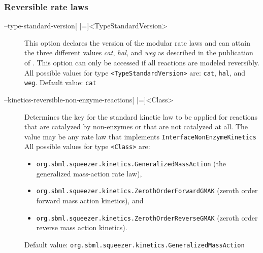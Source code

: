 \subsubsection{Reversible rate laws}
\begin{description}
\item[--type-standard-version{[} |={]}<TypeStandardVersion>]
  This option declares the version of the modular rate laws and
  can attain the three different values \emph{cat}, \emph{hal}, and \emph{weg}
  as described in the publication of \citet{Liebermeister2010}. This option
  can only be accessed if all reactions are modeled reversibly.
  All possible values for type \texttt{<TypeStandardVersion>} are:
  \texttt{cat}, \texttt{hal}, and \texttt{weg}.
  Default value: \texttt{cat}

\item[--kinetics-reversible-non-enzyme-reactions{[} |={]}<Class>]
  Determines the key for the standard kinetic law to be applied
  for reactions that are catalyzed by non-enzymes or that are
  not catalyzed at all. The value may be any rate law that implements
  \texttt{InterfaceNonEnzymeKinetics}
  All possible values for type \texttt{<Class>} are:
  \begin{itemize}
  \item\texttt{org.sbml.squeezer.kinetics.GeneralizedMassAction} (the generalized mass-action rate law),
  \item\texttt{org.sbml.squeezer.kinetics.ZerothOrderForwardGMAK} (zeroth order forward mass action kinetics), and
  \item\texttt{org.sbml.squeezer.kinetics.ZerothOrderReverseGMAK} (zeroth order reverse mass action kinetics).
  \end{itemize}
  Default value: \texttt{org.sbml.squeezer.kinetics.GeneralizedMassAction}


\end{description}
